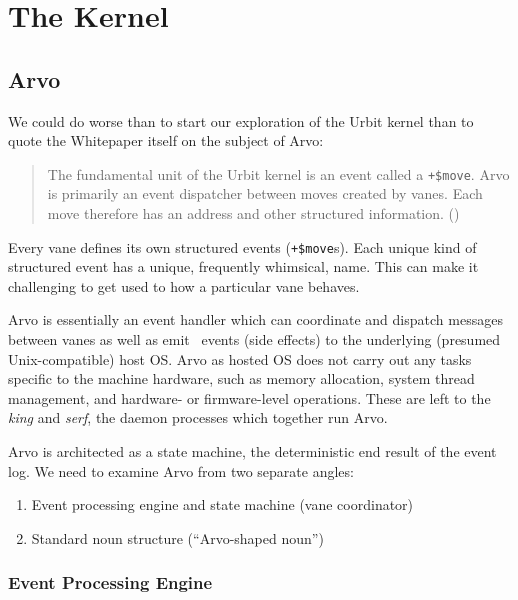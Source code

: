 \setchapterpreamble[u]{\margintoc}
\chapter{The Kernel}


\section{Arvo}

We could do worse than to start our exploration of the Urbit kernel than to quote the Whitepaper itself on the subject of Arvo:

\begin{quote}
The fundamental unit of the Urbit kernel is an event called a \texttt{+\$move}.  Arvo is primarily an event dispatcher between moves created by vanes.  Each move therefore has an address and other structured information.  (\cite{Yarvin2017})
\end{quote}

Every vane defines its own structured events (\texttt{+\$move}s).  Each unique kind of structured event has a unique, frequently whimsical, name.  This can make it challenging to get used to how a particular vane behaves.


Arvo is essentially an event handler which can coordinate and dispatch messages between vanes as well as emit \unix~events (side effects) to the underlying (presumed Unix-compatible) host OS.  Arvo as hosted OS does not carry out any tasks specific to the machine hardware, such as memory allocation, system thread management, and hardware- or firmware-level operations.  These are left to the \emph{king} and \emph{serf}, the daemon processes which together run Arvo.

Arvo is architected as a state machine, the deterministic end result of the event log.  We need to examine Arvo from two separate angles:

\begin{enumerate}
  \item  Event processing engine and state machine (vane coordinator)
  \item  Standard noun structure (“Arvo-shaped noun”)
\end{enumerate}

\subsection{Event Processing Engine}

